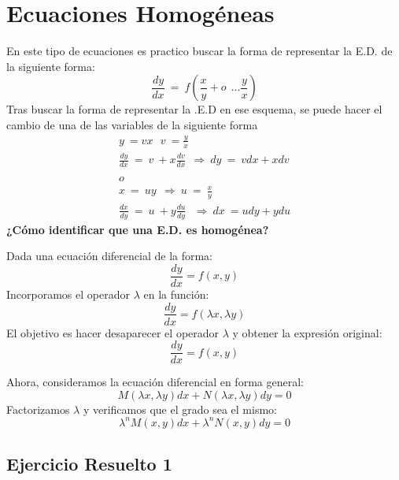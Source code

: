 \section{Ecuaciones Homogéneas}
En este tipo de ecuaciones es practico buscar la forma de representar la E.D. de la siguiente forma:
\begin{equation*}
\frac{dy}{dx} \ =\ f\left(\frac{x}{y} +o\ \ ...\frac{y}{x}\right)
\end{equation*}
Tras buscar la forma de representar la .E.D en ese esquema, se puede hacer el cambio de una de las variables de la siguiente forma
\begin{gather*}
y\ =vx\ \ \ v\ =\frac{y}{x}\\
\frac{dy}{dx} \ =\ v\ +x\frac{dv}{dx} \ \ \Longrightarrow \ dy\ =\ vdx+xdv\\
\\
o\\
x\ =\ uy\ \ \Longrightarrow \ u\ =\ \frac{x}{y}\\
\frac{dx}{dy} \ =\ u\ +y\frac{du}{dy} \ \ \ \Longrightarrow \ dx\ =udy+ydu
\end{gather*}
\textbf{¿Cómo identificar que una E.D. es homogénea?}

Dada una ecuación diferencial de la forma:
\begin{equation*}
    \frac{dy}{dx} = f(x,y)
\end{equation*}
Incorporamos el operador \(\lambda\) en la función:
\begin{equation*}
    \frac{dy}{dx} = f(\lambda x, \lambda y)
\end{equation*}
El objetivo es hacer desaparecer el operador \(\lambda\) y obtener la expresión original:
\begin{equation*}
    \frac{dy}{dx} = f(x,y)
\end{equation*}

Ahora, consideramos la ecuación diferencial en forma general:
\begin{equation*}
    M(\lambda x, \lambda y) dx + N(\lambda x, \lambda y) dy = 0
\end{equation*}
Factorizamos \(\lambda\) y verificamos que el grado sea el mismo:
\begin{equation*}
    \lambda^n M(x,y) dx + \lambda^n N(x,y) dy = 0
\end{equation*}

\subsection{Ejercicio Resuelto 1}

